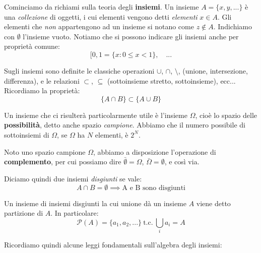 \documentclass[a4paper,11pt]{article}
\begin{document}
Cominciamo da richiami sulla teoria degli \textbf{insiemi}.
Un insieme $A = \{ x, y, ... \}$ è una \textit{collezione} di oggetti, i cui elementi vengono detti \textit{elementi} $x \in A$. Gli elementi che \textit{non} appartengono ad un insieme si notano come $z \notin A$.
Indichiamo con $\emptyset$ l'insieme vuoto.
Notiamo che si possono indicare gli insiemi anche per proprietà comune: 
$$ 
[0, 1 = \{ x: 0 \leq x < 1 \}, \quad ...
$$ 

Sugli insiemi sono definite le classiche operazioni $\cup$, $\cap$, $\setminus$, (unione, intersezione, differenza), e le relazioni $\subset$, $\subseteq$ (sottoinsieme stretto, sottoinsieme), ecc... Ricordiamo la proprietà:
$$
\{ A \cap B \} \subset \{ A \cup B \}
$$

Un insieme che ci risulterà particolarmente utile è l'insieme $\Omega$, cioè lo spazio delle \textbf{possibilità}, detto anche spazio \textit{campione}.
Abbiamo che il numero possibile di sottoinsiemi di $\Omega$, se $\Omega$ ha $N$ elementi, è $2^N$.

Noto uno spazio campione $\Omega$, abbiamo a disposizione l'operazione di \textbf{complemento}, per cui possiamo dire $\bar{\emptyset} = \Omega$, $\bar{\Omega} = \emptyset$, e così via.

Diciamo quindi due insiemi \textit{disgiunti} se vale:
$$
A \cap B = \emptyset \implies \text{A e B sono disgiunti}
$$

Un insieme di insiemi disgiunti la cui unione dà un insieme $A$ viene detto partizione di $A$. In particolare:
$$
\mathcal{P}(A) = \{ a_1, a_2, ... \} \ \text{t.c.} \ \bigcup_i a_i = A
$$

Ricordiamo quindi alcune leggi fondamentali sull'algebra degli insiemi:
\end{document}
